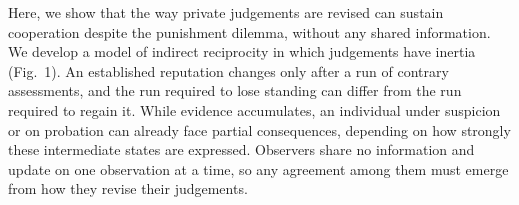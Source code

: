Here, we show that the way private judgements are revised can sustain cooperation despite the punishment dilemma, without any shared information. We develop a model of indirect reciprocity in which judgements have inertia (Fig.~1). An established reputation changes only after a run of contrary assessments, and the run required to lose standing can differ from the run required to regain it. While evidence accumulates, an individual under suspicion or on probation can already face partial consequences, depending on how strongly these intermediate states are expressed. Observers share no information and update on one observation at a time, so any agreement among them must emerge from how they revise their judgements.

